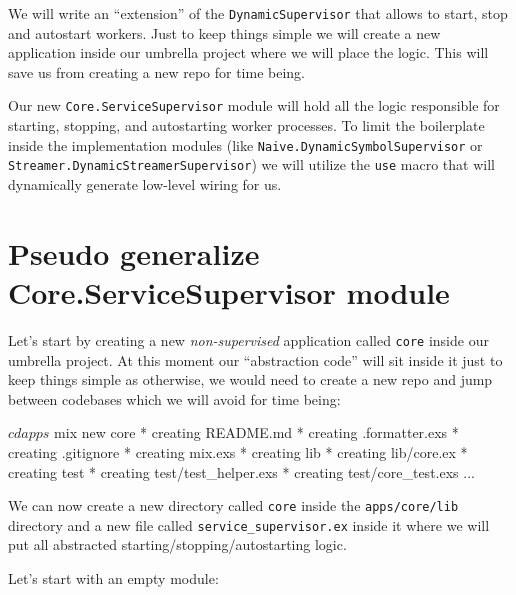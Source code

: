 \documentclass[
  oneside]{book}
\newenvironment{Shaded}{\begin{snugshade}}{\end{snugshade}}
\newcommand{\ExtensionTok}[1]{#1}
\newcommand{\NormalTok}[1]{#1}
\begin{document}
We will write an ``extension'' of the \texttt{DynamicSupervisor} that allows to start, stop and autostart workers. Just to keep things simple we will create a new application inside our umbrella project where we will place the logic. This will save us from creating a new repo for time being.

Our new \texttt{Core.ServiceSupervisor} module will hold all the logic responsible for starting, stopping, and autostarting worker processes. To limit the boilerplate inside the implementation modules (like \texttt{Naive.DynamicSymbolSupervisor} or \texttt{Streamer.DynamicStreamerSupervisor}) we will utilize the \texttt{use} macro that will dynamically generate low-level wiring for us.

\newpage

\section{Pseudo generalize Core.ServiceSupervisor module}\label{pseudo-generalize-core.servicesupervisor-module}

Let's start by creating a new \emph{non-supervised} application called \texttt{core} inside our umbrella project. At this moment our ``abstraction code'' will sit inside it just to keep things simple as otherwise, we would need to create a new repo and jump between codebases which we will avoid for time being:

\begin{Shaded}
\begin{Highlighting}[]
\ExtensionTok{$}\NormalTok{ cd apps}
\ExtensionTok{$}\NormalTok{ mix new core}
\ExtensionTok{*}\NormalTok{ creating README.md}
\ExtensionTok{*}\NormalTok{ creating .formatter.exs}
\ExtensionTok{*}\NormalTok{ creating .gitignore}
\ExtensionTok{*}\NormalTok{ creating mix.exs}
\ExtensionTok{*}\NormalTok{ creating lib}
\ExtensionTok{*}\NormalTok{ creating lib/core.ex}
\ExtensionTok{*}\NormalTok{ creating test}
\ExtensionTok{*}\NormalTok{ creating test/test\_helper.exs}
\ExtensionTok{*}\NormalTok{ creating test/core\_test.exs}
\ExtensionTok{...}
\end{Highlighting}
\end{Shaded}

We can now create a new directory called \texttt{core} inside the \texttt{apps/core/lib} directory and a new file called \texttt{service\_supervisor.ex} inside it where we will put all abstracted starting/stopping/autostarting logic.

Let's start with an empty module:
\end{document}
